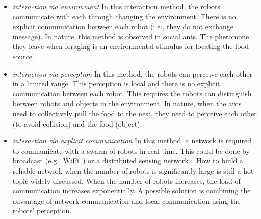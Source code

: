 \begin{itemize}

\item \textit{interaction via environment} In this interaction method, the robots communicate with each through changing the environment. There is no explicit communication between each robot (i.e., they do not exchange message). In nature, this method is observed in social ants. The pheromone they leave when foraging is an environmental stimulus for locating the food source.  

\item \textit{interaction via perception} In this method, the robots can perceive each other in a limited range. This perception is local and there is no explicit communication between each robot. This requires the robots can distinguish between robots and objects in the environment. In nature, when the ants need to collectively pull the food to the nest, they need to perceive each other (to avoid collision) and the food (object).

\item \textit{interaction via explicit communication} In this method, a network is required to communicate with a swarm of robots in real time. This could be done by broadcast (e.g., WiFi~\cite{Gerkey:TRA:2002}) or a distributed sensing network~\cite{Winfield:LNCS:2000}. How to build a reliable network when the number of robots is significantly large is still a hot topic widely discussed. When the number of robots increases, the load of communication increases exponentially. A possible solution is combining the advantage of network communication and local communication using the robots' perception.

\end{itemize}

